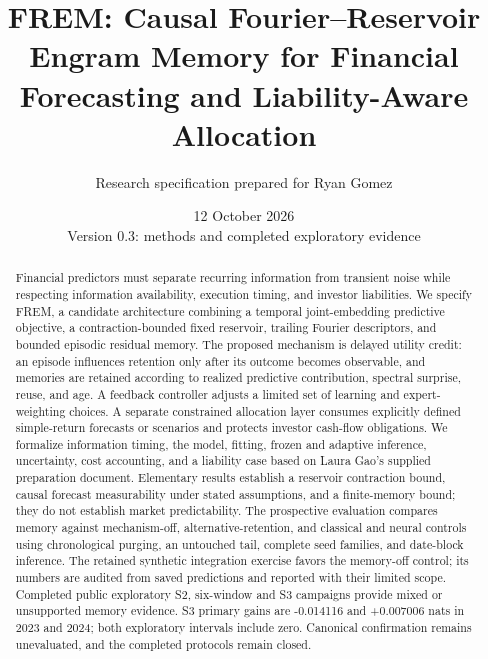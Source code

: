 \documentclass[11pt,a4paper]{article}
\title{FREM: Causal Fourier--Reservoir Engram Memory for Financial Forecasting and Liability-Aware Allocation}
\author{Research specification prepared for Ryan Gomez}
\date{12 October 2026\\Version 0.3: methods and completed exploratory evidence}
\begin{document}
\maketitle
\begin{center}
\end{center}

\begin{abstract}
Financial predictors must separate recurring information from transient noise while respecting information availability, execution timing, and investor liabilities. We specify FREM, a candidate architecture combining a temporal joint-embedding predictive objective, a contraction-bounded fixed reservoir, trailing Fourier descriptors, and bounded episodic residual memory. The proposed mechanism is delayed utility credit: an episode influences retention only after its outcome becomes observable, and memories are retained according to realized predictive contribution, spectral surprise, reuse, and age. A feedback controller adjusts a limited set of learning and expert-weighting choices. A separate constrained allocation layer consumes explicitly defined simple-return forecasts or scenarios and protects investor cash-flow obligations. We formalize information timing, the model, fitting, frozen and adaptive inference, uncertainty, cost accounting, and a liability case based on Laura Gao's supplied preparation document. Elementary results establish a reservoir contraction bound, causal forecast measurability under stated assumptions, and a finite-memory bound; they do not establish market predictability. The prospective evaluation compares memory against mechanism-off, alternative-retention, and classical and neural controls using chronological purging, an untouched tail, complete seed families, and date-block inference. The retained synthetic integration exercise favors the memory-off control; its numbers are audited from saved predictions and reported with their limited scope. Completed public exploratory S2, six-window and S3 campaigns provide mixed or unsupported memory evidence. S3 primary gains are -0.014116 and +0.007006 nats in 2023 and 2024; both exploratory intervals include zero. Canonical confirmation remains unevaluated, and the completed protocols remain closed.
\end{abstract}
\newpage
\begingroup
\small
\setlength{\parskip}{0pt}
\tableofcontents
\endgroup
\newpage
\end{document}
